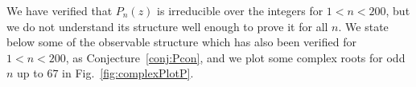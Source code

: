 \documentclass[12pt]{amsart}
\newcommand{\conref}[1]{Conjecture~\ref{conj:#1}}
\newcommand{\fref}[1]{Fig.~\ref{fig:#1}}
\begin{document}
%


We have verified that $P_n(z)$ is irreducible over the integers for
${1<n < 200}$, but we do not understand its structure well enough to
prove it for all $n$.  We state below some of the observable structure
which has also been verified for ${1 < n < 200}$, as \conref{Pcon}, and
we plot some complex roots for odd $n$ up to $67$ in
\fref{complexPlotP}.
\end{document}
